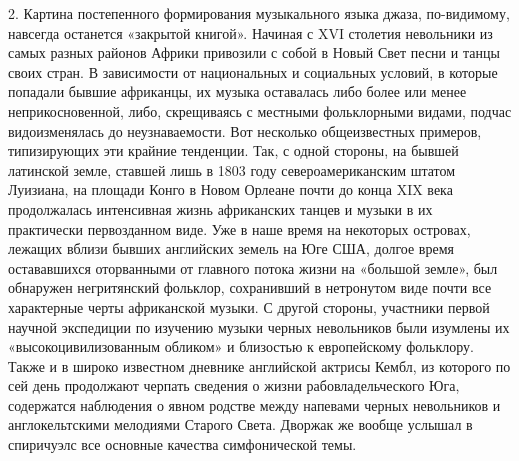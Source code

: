 2.  Картина   постепенного  формирования  музыкального   языка  джаза,
по-видимому,  навсегда  останется  «закрытой книгой».  Начиная  с  XVI
столетия невольники из самых разных районов Африки привозили с собой в
Новый Свет  песни и танцы  своих стран. В зависимости  от национальных
и  социальных  условий,  в   которые  попадали  бывшие  африканцы,  их
музыка  оставалась  либо  более   или  менее  неприкосновенной,  либо,
скрещиваясь с  местными фольклорными видами, подчас  видоизменялась до
неузнаваемости. Вот несколько общеизвестных примеров, типизирующих эти
крайние тенденции.  Так, с одной  стороны, на бывшей  латинской земле,
ставшей  лишь  в  1803  году североамериканским  штатом  Луизиана,  на
площади Конго  в Новом  Орлеане почти до  конца XIX  века продолжалась
интенсивная  жизнь  африканских  танцев  и  музыки  в  их  практически
первозданном виде.  Уже в  наше время  на некоторых  островах, лежащих
вблизи бывших английских земель на  Юге США, долгое время остававшихся
оторванными от главного потока жизни на «большой земле», был обнаружен
негритянский  фольклор,  сохранивший  в   нетронутом  виде  почти  все
характерные  черты африканской  музыки.  С  другой стороны,  участники
первой научной  экспедиции по изучению музыки  черных невольников были
изумлены их «высокоцивилизованным обликом»  и близостью к европейскому
фольклору.  Также и  в  широко известном  дневнике английской  актрисы
Кембл, из  которого по  сей день продолжают  черпать сведения  о жизни
рабовладельческого Юга,  содержатся наблюдения  о явном  родстве между
напевами  черных  невольников   и  англокельтскими  мелодиями  Старого
Света. Дворжак  же вообще услышал  в спиричуэлс все  основные качества
симфонической темы.

